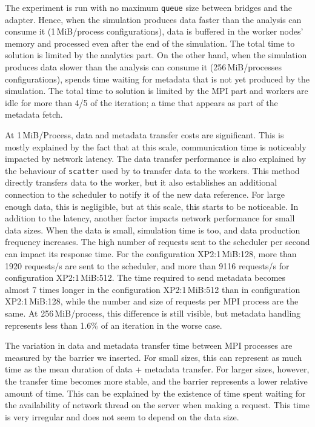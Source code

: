 The experiment is run with no maximum \verb|queue| size between \deisa bridges and the adapter.
Hence, when the simulation produces data faster than the analysis can consume it (1\,MiB/process configurations), data is buffered in the worker nodes' memory and processed even after the end of the simulation.
The total time to solution is limited by the analytics part. On the other hand, when the simulation produces data slower than the analysis can consume it (256\,MiB/processes configurations), \dask spends time waiting for metadata that is not yet produced by the simulation.
The total time to solution is limited by the MPI part and \dask workers are idle for more than 4/5 of the iteration; a time that appears as part of the metadata fetch.

At 1\,MiB/Process, data and metadata transfer costs are significant. This is mostly explained by the fact that at this scale, communication time is noticeably impacted by network latency. The data transfer performance is also explained by the behaviour of \dask \verb|scatter| used by \deisa to transfer data to the workers. 
This method directly transfers data to the worker, but it also establishes an additional connection to the scheduler to notify it of the new data reference.
For large enough data, this is negligible, but at this scale, this starts to be noticeable. 
In addition to the latency, another factor impacts network performance for small data sizes.
When the data is small, simulation time is too, and data production frequency increases.
The high number of requests sent to the scheduler per second can impact its response time.
For the configuration XP2:1\,MiB:128, more than 1920 requests/s are sent to the scheduler, and more than 9116 requests/s for configuration XP2:1\,MiB:512.
The time required to send metadata becomes almost 7 times longer in the configuration XP2:1\,MiB:512 than in configuration XP2:1\,MiB:128, while the number and size of requests per MPI process are the same.
At 256\,MiB/process, this difference is still visible, but metadata handling represents less than 1.6\% of an iteration in the worse case.

The variation in data and metadata transfer time between MPI processes are measured by the barrier we inserted.
For small sizes, this can represent as much time as the mean duration of data + metadata transfer.
For larger sizes, however, the transfer time becomes more stable, and the barrier represents a lower relative amount of time.
This can be explained by the existence of time spent waiting for the availability of \dask network thread on the server when making a request.
This time is very irregular and does not seem to depend on the data size.

